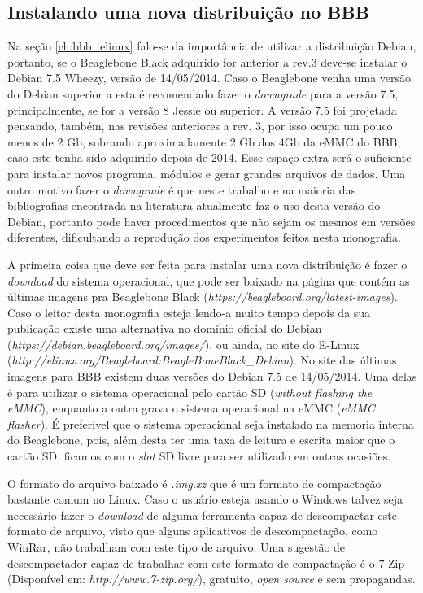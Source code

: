 \subsection{Instalando uma nova distribuição no BBB}

Na seção \ref{ch:bbb_elinux} falo-se da importância de utilizar a distribuição Debian, portanto, se o Beaglebone Black adquirido for anterior a rev.3 deve-se instalar o Debian 7.5 Wheezy, versão de 14/05/2014. Caso o Beaglebone venha uma versão do Debian superior a esta é recomendado fazer o \emph{downgrade} para a versão 7.5, principalmente, se for a versão 8 Jessie ou superior. A versão 7.5 foi projetada pensando, também, nas revisões anteriores a rev. 3, por isso ocupa um pouco menos de 2 Gb, sobrando aproximadamente 2 Gb dos 4Gb da eMMC do BBB, caso este tenha sido adquirido depois de 2014. Esse espaço extra será o suficiente para instalar novos programa, módulos e gerar grandes arquivos de dados. Uma outro motivo fazer o \emph{downgrade} é que neste trabalho e na maioria das bibliografias encontrada na literatura atualmente faz o uso desta versão do Debian, portanto pode haver procedimentos que não sejam os mesmos em versões diferentes, dificultando a reprodução dos experimentos feitos nesta monografia. 

A primeira coisa que deve ser feita para instalar uma nova distribuição é fazer o \emph{download} do sistema operacional, que pode ser baixado na página que contém as  últimas imagens pra Beaglebone Black (\emph{https://beagleboard.org/latest-images}). Caso o leitor desta monografia esteja lendo-a muito tempo depois da sua publicação existe uma alternativa no domínio oficial do Debian (\emph{https://debian.beagleboard.org/images/}), ou ainda, no site do E-Linux (\emph{http://elinux.org/Beagleboard:BeagleBoneBlack\_Debian}). No site das últimas imagens para BBB existem duas versões do Debian 7.5 de 14/05/2014. Uma delas é para utilizar o sistema operacional pelo cartão SD (\emph{without flashing the eMMC}), enquanto a outra grava o sistema operacional na eMMC (\emph{eMMC flasher}). É preferível que o sistema operacional seja instalado na memoria interna do Beaglebone, pois, além desta ter uma taxa de leitura e escrita maior que o cartão SD, ficamos com o \emph{slot} SD livre para ser utilizado em outras ocasiões.

O formato do arquivo baixado é \emph{.img.xz} que é um formato de compactação bastante comum no Linux. Caso o usuário esteja usando o Windows talvez seja necessário fazer o \emph{download} de alguma ferramenta capaz de descompactar este formato de arquivo, visto que alguns aplicativos de descompactação, como WinRar, não trabalham com este tipo de arquivo. Uma sugestão de descompactador capaz de trabalhar com este formato de compactação é o 7-Zip (Disponível em: \emph{http://www.7-zip.org/}), gratuito, \emph{open source} e sem propagandas.


